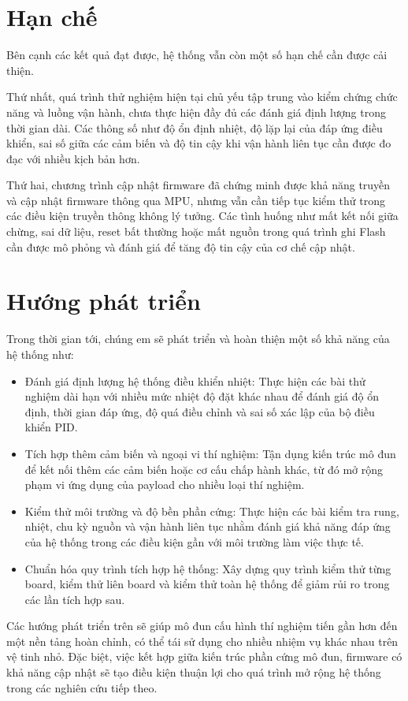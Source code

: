 \section{Hạn chế}
\label{sec:han-che}

Bên cạnh các kết quả đạt được, hệ thống vẫn còn một số hạn chế cần được cải thiện. 

Thứ nhất, quá trình thử nghiệm hiện tại chủ yếu tập trung vào kiểm chứng chức năng và luồng vận hành, chưa thực hiện đầy đủ các đánh giá định lượng trong thời gian dài. Các thông số như độ ổn định nhiệt, độ lặp lại của đáp ứng điều khiển, sai số giữa các cảm biến và độ tin cậy khi vận hành liên tục cần được đo đạc với nhiều kịch bản hơn.

Thứ hai, chương trình cập nhật firmware đã chứng minh được khả năng truyền và cập nhật firmware thông qua MPU, nhưng vẫn cần tiếp tục kiểm thử trong các điều kiện truyền thông không lý tưởng. Các tình huống như mất kết nối giữa chừng, sai dữ liệu, reset bất thường hoặc mất nguồn trong quá trình ghi Flash cần được mô phỏng và đánh giá để tăng độ tin cậy của cơ chế cập nhật.

\section{Hướng phát triển}
\label{sec:huong-phat-trien}

Trong thời gian tới, chúng em sẽ phát triển và hoàn thiện một số khả năng của hệ thống như:

\begin{itemize}
    \item Đánh giá định lượng hệ thống điều khiển nhiệt: Thực hiện các bài thử nghiệm dài hạn với nhiều mức nhiệt độ đặt khác nhau để đánh giá độ ổn định, thời gian đáp ứng, độ quá điều chỉnh và sai số xác lập của bộ điều khiển PID.

    \item Tích hợp thêm cảm biến và ngoại vi thí nghiệm: Tận dụng kiến trúc mô đun để kết nối thêm các cảm biến hoặc cơ cấu chấp hành khác, từ đó mở rộng phạm vi ứng dụng của payload cho nhiều loại thí nghiệm.

    \item Kiểm thử môi trường và độ bền phần cứng: Thực hiện các bài kiểm tra rung, nhiệt, chu kỳ nguồn và vận hành liên tục nhằm đánh giá khả năng đáp ứng của hệ thống trong các điều kiện gần với môi trường làm việc thực tế.

    \item Chuẩn hóa quy trình tích hợp hệ thống: Xây dựng quy trình kiểm thử từng board, kiểm thử liên board và kiểm thử toàn hệ thống để giảm rủi ro trong các lần tích hợp sau.
\end{itemize}

Các hướng phát triển trên sẽ giúp mô đun cấu hình thí nghiệm tiến gần hơn đến một nền tảng hoàn chỉnh, có thể tái sử dụng cho nhiều nhiệm vụ khác nhau trên vệ tinh nhỏ. Đặc biệt, việc kết hợp giữa kiến trúc phần cứng mô đun, firmware có khả năng cập nhật sẽ tạo điều kiện thuận lợi cho quá trình mở rộng hệ thống trong các nghiên cứu tiếp theo.
